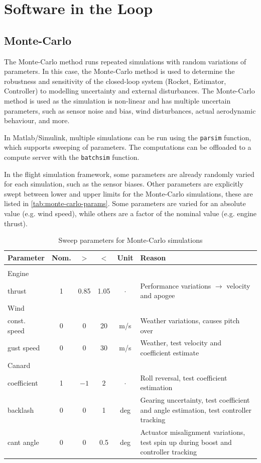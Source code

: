 \section{Software in the Loop}

\subsection{Monte-Carlo}

The Monte-Carlo method runs repeated simulations with random variations of parameters.
In this case, the Monte-Carlo method is used to determine the robustness and sensitivity of the closed-loop system (Rocket, Estimator, Controller) to modelling uncertainty and external disturbances.
The Monte-Carlo method is used as the simulation is non-linear and has multiple uncertain parameters, such as sensor noise and bias, wind disturbances, actual aerodynamic behaviour, and more. 

In Matlab/Simulink, multiple simulations can be run using the \texttt{parsim} function, which supports sweeping of parameters.
The computations can be offloaded to a compute server with the \texttt{batchsim} function.

In the flight simulation framework, some parameters are already randomly varied for each simulation, such as the sensor biases.
Other parameters are explicitly swept between lower and upper limits for the Monte-Carlo simulations, these are listed in \autoref{tab:monte-carlo-params}. 
Some parameters are varied for an absolute value (e.g. wind speed), while others are a factor of the nominal value (e.g. engine thrust).

\begin{table}[ht]
    \centering
    \begin{tabularx}{\linewidth}{l c c c c X }
         Parameter & Nom. & $>$ & $<$ & Unit & Reason \\[0.2em]
         \hline \\[-1em]
         Engine &&&&& \\
         thrust & 1 & 0.85 & 1.05 & $\cdot$ & Performance variations $\to$ velocity and apogee \\
         Wind \\ const. speed & 0 & 0 & 20 & m/s & Weather variations, causes pitch over \\
         gust speed & 0 & 0 & 30 & m/s  & Weather, test velocity and coefficient estimate \\
         Canard \\ coefficient & 1 & $-1$ & $2$ & $\cdot$ & Roll reversal, test coefficient estimation \\
         backlash & 0 & 0 & 1 & deg & Gearing uncertainty, test coefficient and angle estimation, test controller tracking \\
         cant angle & 0 & 0 & 0.5 & deg & Actuator misalignment variations, test spin up during boost and controller tracking
    \end{tabularx}
    \caption{Sweep parameters for Monte-Carlo simulations}
    \label{tab:monte-carlo-params}
\end{table}

